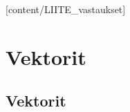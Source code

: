 %
%
%
%

\providecommand{\lukufilter}[2]{#2} %
\newcommand{\osa}[1]{\chapter{#1}} %
\newcommand{\nosa}[1]{\chapter*{#1} \addcontentsline{toc}{chapter}{#1}} %
\newcommand{\luku}[2]{\section{#2} \lukufilter{#1}{ }} %
\newcommand{\nluku}[2]{\section*{#2} \addcontentsline{toc}{section}{#2} \lukufilter{#1}{}} %
\newcommand{\vast}{\section*{Vastaukset} \addcontentsline{toc}{section}{Vastaukset} \begin{vastaussivu}  \end{vastaussivu}}

[content/LIITE_vastaukset] %

\newpage

\osa{Vektorit}
    \luku{vektorit}{Vektorit}

